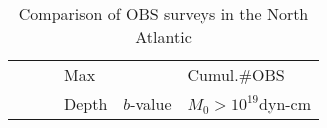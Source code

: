 \documentclass[aguplus]{aguplus}
\newcommand{\tm}{\tablenotemark}
\begin{document}
\begin{article}
\begin{table*}
\caption{Comparison of OBS surveys in the North Atlantic }

\begin{flushleft}
\begin{tabular}{clllcrc}
                 &           &           & Max   &                  &\multicolumn{2}{l}{Cumul.\#OBS}   \\
                 &           &           & Depth & $b$-value        &\multicolumn{2}{l}{$M_0>10^{19}$dyn-cm\tm{c}}  \\

\end{tabular}
\end{flushleft}
\end{table*}
\end{article}
\end{document}
